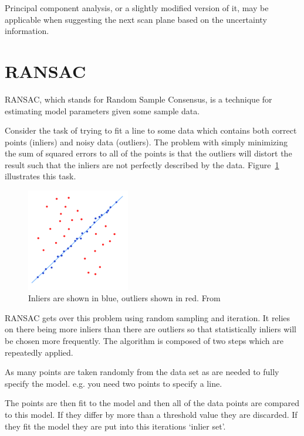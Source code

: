Principal component analysis, or a slightly modified version of it, may be applicable when suggesting the next scan plane based on the uncertainty information.

\newpage
\section{RANSAC}\label{background:ransac}
RANSAC, which stands for Random Sample Consensus, is a technique for estimating model parameters given some sample data.

Consider the task of trying to fit a line to some data which contains both correct points (inliers) and noisy data (outliers). The problem with simply minimizing the sum of squared errors to all of the points is that the outliers will distort the result such that the inliers are not perfectly described by the data. Figure~\ref{fig:ransac} illustrates this task.

\begin{figure}[h]
    \centering
	\includegraphics[width=0.4\textwidth]{images/background/ransac.png}
    \caption{Inliers are shown in blue, outliers shown in red. From \cite{ransac:image}}
    \label{fig:ransac}
\end{figure}

RANSAC gets over this problem using random sampling and iteration. It relies on there being more inliers than there are outliers so that statistically inliers will be chosen more frequently. The algorithm is composed of two steps which are repeatedly applied.

As many points are taken randomly from the data set as are needed to fully specify the model. e.g. you need two points to specify a line.

The points are then fit to the model and then all of the data points are compared to this model. If they differ by more than a threshold value they are discarded. If they fit the model they are put into this iterations ‘inlier set’.

